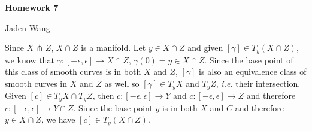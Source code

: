 \documentclass[12pt]{article}
\begin{document}
\centerline {\textsf{\textbf{\LARGE{Homework 7}}}}
\centerline {Jaden Wang}
\vspace{.15in}
\begin{problem}[1.5.4]
	Since $ X \pitchfork Z$, $ X \cap Z$ is a manifold.
	Let $ y \in X \cap Z$ and given $ [ \gamma] \in T_y(X \cap Z)$, we know that $ \gamma: [- \epsilon, \epsilon] \to X \cap Z$, $ \gamma(0)=y \in X \cap Z$. Since the base point of this class of smooth curves is in both $ X$ and  $ Z$, $ [ \gamma]$ is also an equivalence class of smooth curves in $ X$ and  $ Z$ as well so  $ [ \gamma] \in T_y X$ and $ T_y Z$, \emph{i.e.} their intersection. Given $ [c] \in T_y X \cap T_y Z$, then $ c: [- \epsilon, \epsilon] \to Y$ and $ c: [- \epsilon, \epsilon] \to Z$ and therefore $ c: [- \epsilon, \epsilon] \to Y \cap Z$. Since the base point $ y$ is in both  $ X$ and  $ C$ and therefore  $ y \in X \cap Z$, we have $[c] \in T_y (X \cap Z)$.
\end{problem}
\end{document}
